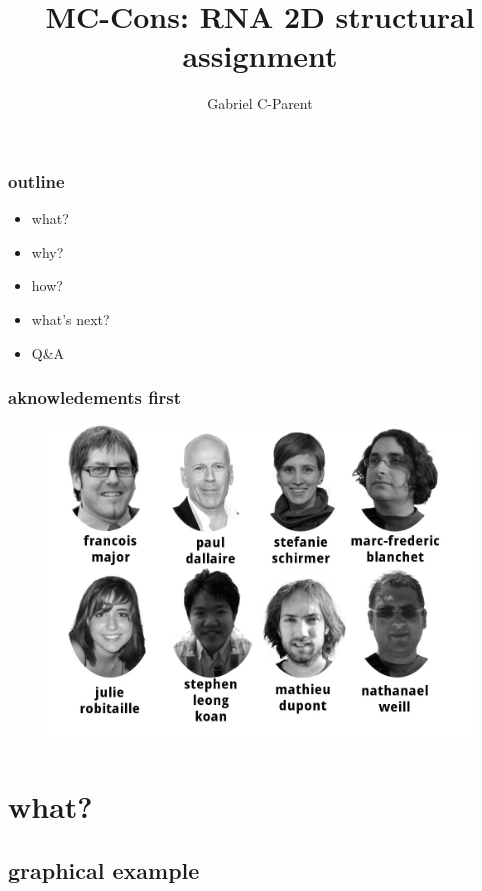 \documentclass{beamer}
\title{MC-Cons: RNA 2D structural assignment}
\author{Gabriel C-Parent}
\begin{document}
\maketitle
\begin{frame}
	\frametitle{outline}
	\begin{center}
		\begin{itemize}
			\item what?
			\item why?
			\item how?
			\item what's next?
			\item Q\&A
		\end{itemize}
	\end{center}
\end{frame}


\begin{frame}
	\frametitle{aknowledements first}
	\begin{figure}[!htb]
	\centering
	\includegraphics[scale=0.25]{lab.jpg}
	\end{figure}
\end{frame}

\section{what?}

\subsection{graphical example}
\end{document}
